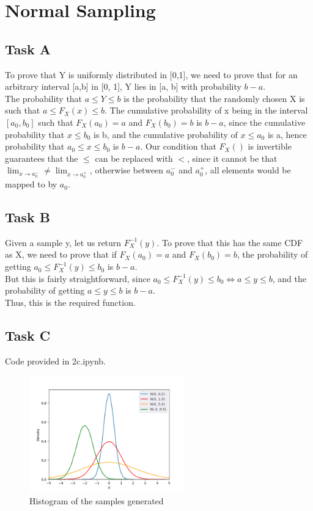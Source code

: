 \section{Normal Sampling}
\subsection{Task A}
To prove that Y is uniformly distributed in [0,1], we need to prove that for an arbitrary interval [a,b] in [0, 1], Y lies in [a, b] with probability $b-a$.\\
The probability that $a \le Y \le b$ is the probability that the randomly chosen X is such that $a \le F_X(x) \le b$. The cumulative probability of x being in the interval $[a_0, b_0]$ such that $F_X(a_0) = a$ and $F_X(b_0) = b$ is $b-a$, since the cumulative probability that $x \le b_0$ is b, and the cumulative probability of $x\le a_0$ is a, hence probability that $a_0 \le x \le b_0$ is $b-a$. Our condition that $F_X()$ is invertible guarantees that the $\le$ can be replaced with $<$, since it cannot be that $\lim_{x\to a_0^-} \ne \lim_{x\to a_0^+}$, otherwise between $a_0^-$ and $a_0^+$, all elements would be mapped to by $a_0$.

\subsection{Task B}
Given a sample y, let us return $F_X^{-1}(y)$. To prove that this has the same CDF as X, we need to prove that if $F_X(a_0)=a$ and $F_X(b_0)=b$, the probability of getting $a_0 \le F_X^{-1}(y) \le b_0$ is $b-a$.\\
But this is fairly straightforward, since $a_0 \le F_X^{-1}(y) \le b_0 \iff a \le y \le b$, and the probability of getting $a \le y \le b$ is $b-a$.\\
Thus, this is the required function.

\subsection{Task C}
Code provided in 2c.ipynb.
\begin{figure}[H]
    \centering
    \includegraphics[width=0.6\textwidth]{../images/2c.png}
    \caption{Histogram of the samples generated}
    \label{fig:2c}
\end{figure}

